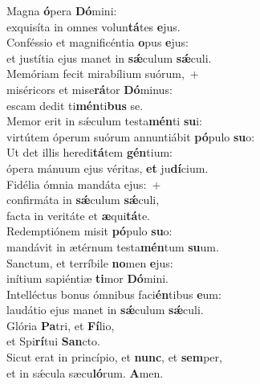 \evenverse Magna \textbf{ó}pera \textbf{Dó}mini:~\*\\
\evenverse exquisíta in omnes volun\textbf{tá}tes \textbf{e}jus.\\
\oddverse Conféssio et magnificéntia \textbf{o}pus \textbf{e}jus:~\*\\
\oddverse et justítia ejus manet in \textbf{sǽ}culum \textbf{sǽ}culi.\\
\evenverse Memóriam fecit mirabílium suórum,~+\\
\evenverse  miséricors et mise\textbf{rá}tor \textbf{Dó}minus:~\*\\
\evenverse escam dedit ti\textbf{mén}ti\textbf{bus} se.\\
\oddverse Memor erit in sǽculum testa\textbf{mén}ti \textbf{su}i:~\*\\
\oddverse virtútem óperum suórum annuntiábit \textbf{pó}pulo \textbf{su}o:\\
\evenverse Ut det illis heredi\textbf{tá}tem \textbf{gén}tium:~\*\\
\evenverse ópera mánuum ejus véritas, \textbf{et} ju\textbf{dí}cium.\\
\oddverse Fidélia ómnia mandáta ejus:~+\\
\oddverse  confirmáta in \textbf{sǽ}culum \textbf{sǽ}culi,~\*\\
\oddverse facta in veritáte et \textbf{æ}qui\textbf{tá}te.\\
\evenverse Redemptiónem misit \textbf{pó}pulo \textbf{su}o:~\*\\
\evenverse mandávit in ætérnum testa\textbf{mén}tum \textbf{su}um.\\
\oddverse Sanctum, et terríbile \textbf{no}men \textbf{e}jus:~\*\\
\oddverse inítium sapiéntiæ \textbf{ti}mor \textbf{Dó}mini.\\
\evenverse Intelléctus bonus ómnibus faci\textbf{én}tibus \textbf{e}um:~\*\\
\evenverse laudátio ejus manet in \textbf{sǽ}culum \textbf{sǽ}culi.\\
\oddverse Glória \textbf{Pa}tri, et \textbf{Fí}lio,~\*\\
\oddverse et Spi\textbf{rí}tui \textbf{San}cto.\\
\evenverse Sicut erat in princípio, et \textbf{nunc}, et \textbf{sem}per,~\*\\
\evenverse et in sǽcula sæcu\textbf{ló}rum. \textbf{A}men.\\
